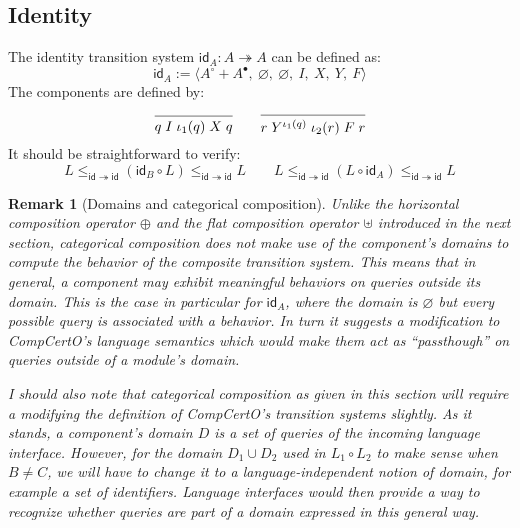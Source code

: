 \documentclass{article}
\newtheorem{remark}{Remark}
\begin{document}

\subsection{Identity} %

The identity transition system $\mathsf{id}_A : A \twoheadrightarrow A$
can be defined as:
\[
  \mathsf{id}_A :=
    \langle A^\circ + A^\bullet,\: \varnothing,\: \varnothing,\: I,\: X,\: Y,\: F \rangle
\]
The components are defined by:
\[
  \begin{prooftree}
    \infer0{q \mathrel{I} \iota_1(q) \mathrel{X} q}
  \end{prooftree}
  \qquad
  \begin{prooftree}
    \infer0{r \mathrel{Y^{\iota_1(q)}} \iota_2(r) \mathrel{F} r}
  \end{prooftree}
\]
It should be straightforward to verify:
\[
  L
  \le_{\mathsf{id} \twoheadrightarrow \mathsf{id}}
  (\mathsf{id}_B \circ L)
  \le_{\mathsf{id} \twoheadrightarrow \mathsf{id}}
  L
  \qquad
  L
  \le_{\mathsf{id} \twoheadrightarrow \mathsf{id}}
  (L \circ \mathsf{id}_A)
  \le_{\mathsf{id} \twoheadrightarrow \mathsf{id}}
  L
\]

\begin{remark}[Domains and categorical composition]
  Unlike the horizontal composition operator $\oplus$
  and the flat composition operator $\uplus$ introduced in the next section,
  categorical composition does not make use of the component's domains
  to compute the behavior of the composite transition system.
  This means that in general,
  a component may exhibit meaningful behaviors on queries outside its domain.
  This is the case in particular for $\mathsf{id}_A$,
  where the domain is $\varnothing$ but
  every possible query is associated with a behavior.
  In turn it suggests a modification to CompCertO's
  language semantics which would make them act as ``passthough''
  on queries outside of a module's domain.

  I should also note that categorical composition as
  given in this section will require a modifying
  the definition of CompCertO's transition systems slightly.
  As it stands,
  a component's domain $D$ is a set of queries of
  the incoming language interface.
  However,
  for the domain $D_1 \cup D_2$ used in $L_1 \circ L_2$
  to make sense when $B \neq C$,
  we will have to change it to a language-independent
  notion of domain, for example a set of identifiers.
  Language interfaces
  would then provide a way to recognize whether queries
  are part of a domain expressed in this general way.
\end{remark}
\end{document}
